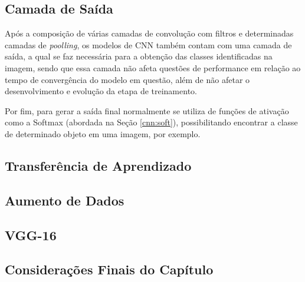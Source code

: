 \subsection{Camada de Saída}
\label{cnn:output}

Após a composição de várias camadas de convolução com filtros e determinadas camadas de \textit{poolling}, os modelos de CNN também contam com uma camada de saída, a qual se faz necessária para a obtenção das classes identificadas na imagem, sendo que essa camada não afeta questões de performance em relação ao tempo de convergência do modelo em questão, além de não afetar o desenvolvimento e evolução da etapa de treinamento.

Por fim, para gerar a saída final normalmente se utiliza de funções de ativação como a Softmax (abordada na Seção \ref{cnn:soft}), possibilitando encontrar a classe de determinado objeto em uma imagem, por exemplo.

\subsection{Transferência de Aprendizado}
\label{cnn:transfer}

\subsection{Aumento de Dados}
\label{cnn:augment}

\subsection{VGG-16}
\label{cnn:vgg}

\subsection{Considerações Finais do Capítulo}